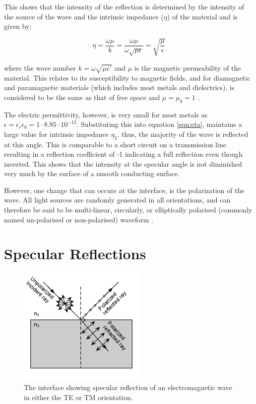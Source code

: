 \documentclass[fleqn,twoside,12pt]{report}
\begin{document}
This shows that the intensity of the reflection is determined by the intensity of the source of the wave and the intrinsic impedance ($\eta$) of the material and is given by:

\begin{equation}
\eta = \frac{\omega \mu}{k} = \frac{\omega \mu}{\omega \sqrt{\mu \epsilon}}= \sqrt{\frac{\mu}{\epsilon}}
\label{eqn:eta}
\end{equation}

where the wave number $k = \omega \sqrt{\mu \epsilon'}$ and $\mu$ is the magnetic permeability of the material. This relates to its susceptibility to magnetic fields, and for diamagnetic and paramagnetic materials (which includes most metals and dielectrics), is considered to be the same as that of free space and $\mu = \mu_0 = 1$ \cite{ulaby}. 

The electric permittivity, however, is very small for most metals as $\epsilon = \epsilon_r \epsilon_0 = 1 \cdot 8.85\cdot10^{-12}$. Substituting this into equation \ref{eqn:eta}, maintains a large value for intrinsic impedance $\eta_2$. thus, the majority of the wave is reflected at this angle. This is comparable to a short circuit on a transmission line resulting in a reflection coefficient of -1 indicating a full reflection even though inverted. This shows that the intensity at the specular angle is not diminished very much by the surface of a smooth conducting surface.

However, one change that can occurs at the interface, is the polarization of the wave. All light sources are randomly generated in all orientations, and can therefore be said to be multi-linear, circularly, or elliptically polarised (commonly named un-polarised or non-polarised) waveform \cite{artusi,nelson}.


\section{Specular Reflections} 

\begin{figure}[h]
	\centering
	\includegraphics[scale=0.9]{unpolar_polar.png}
	\caption{The interface showing specular reflection of an electromagnetic wave in either the TE or TM orientation.}
	\label{fig:unpolar_polar}
\end{figure}
\end{document}
